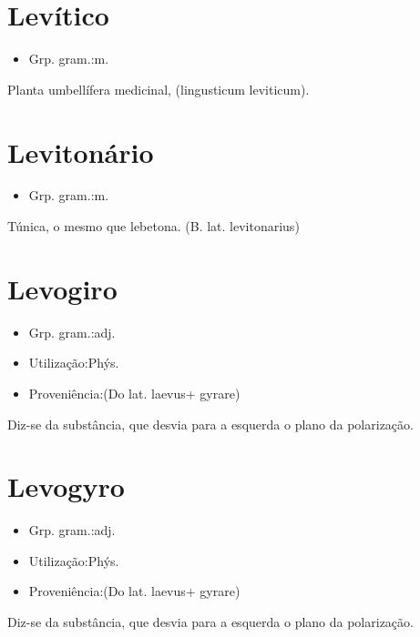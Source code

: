 \section{Levítico}
\begin{itemize}
\item {Grp. gram.:m.}
\end{itemize}
Planta umbellífera medicinal, (\textunderscore lingusticum leviticum\textunderscore ).
\section{Levitonário}
\begin{itemize}
\item {Grp. gram.:m.}
\end{itemize}
Túnica, o mesmo que \textunderscore lebetona\textunderscore .
(B. lat. \textunderscore levitonarius\textunderscore )
\section{Levogiro}
\begin{itemize}
\item {Grp. gram.:adj.}
\end{itemize}
\begin{itemize}
\item {Utilização:Phýs.}
\end{itemize}
\begin{itemize}
\item {Proveniência:(Do lat. \textunderscore laevus\textunderscore  + \textunderscore gyrare\textunderscore )}
\end{itemize}
Diz-se da substância, que desvia para a esquerda o plano da polarização.
\section{Levogyro}
\begin{itemize}
\item {Grp. gram.:adj.}
\end{itemize}
\begin{itemize}
\item {Utilização:Phýs.}
\end{itemize}
\begin{itemize}
\item {Proveniência:(Do lat. \textunderscore laevus\textunderscore  + \textunderscore gyrare\textunderscore )}
\end{itemize}
Diz-se da substância, que desvia para a esquerda o plano da polarização.
